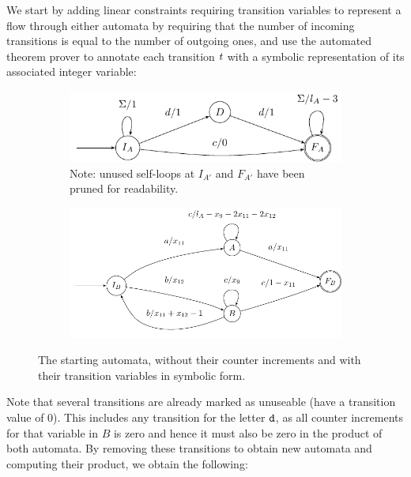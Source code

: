 We start by adding linear constraints requiring transition variables to represent a flow through either automata by requiring that the number of incoming transitions is equal to the number of outgoing ones, and use the automated theorem prover to annotate each transition $t$ with a symbolic representation of its associated integer variable:
\begin{figure}[h]
    \centering 
  \begin{subfigure}[b]{0.5\textwidth}
    \centering
    \includegraphics[scale=\autscale]{a_annotated}
    \caption{Note: unused self-loops at $I_{A'}$ and $F_{A'}$ have been pruned for readability.}\label{fig:aut_a_annotated}
  \end{subfigure}
  \begin{subfigure}[b]{0.5\textwidth}
    \centering
    \includegraphics[scale=\autscale]{b_annotated}
    \caption{}\label{fig:aut_b_annotated}
  \end{subfigure}
  \caption{The starting automata, without their counter increments and with their transition variables in symbolic form.}\label{fig:propagated}
\end{figure}

Note that several transitions are already marked as unuseable (have a transition value of $0$). This includes any transition for the letter $\texttt{d}$, as all counter increments for that variable in $B$ is zero and hence it must also be zero in the product of both automata. By removing these transitions to obtain new automata and computing their product, we obtain the following:

